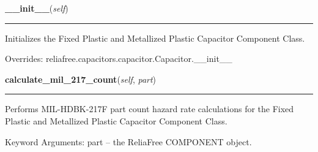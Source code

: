 \hspace{.8\funcindent}\begin{boxedminipage}{\funcwidth}

    \raggedright \textbf{\_\_init\_\_}(\textit{self})

    \vspace{-1.5ex}

    \rule{\textwidth}{0.5\fboxrule}
\setlength{\parskip}{2ex}
    Initializes the Fixed Plastic and Metallized Plastic Capacitor 
    Component Class.

\setlength{\parskip}{1ex}
      Overrides: reliafree.capacitors.capacitor.Capacitor.\_\_init\_\_

    \end{boxedminipage}

    \label{reliafree:capacitors:fixed:Plastic:calculate_mil_217_count}

    \vspace{0.5ex}

\hspace{.8\funcindent}\begin{boxedminipage}{\funcwidth}

    \raggedright \textbf{calculate\_mil\_217\_count}(\textit{self}, \textit{part})

    \vspace{-1.5ex}

    \rule{\textwidth}{0.5\fboxrule}
\setlength{\parskip}{2ex}
    Performs MIL-HDBK-217F part count hazard rate calculations for the 
    Fixed Plastic and Metallized Plastic Capacitor Component Class.

    Keyword Arguments: part -- the ReliaFree COMPONENT object.

\setlength{\parskip}{1ex}
    \end{boxedminipage}

    \label{reliafree:capacitors:fixed:Plastic:calculate_mil_217_stress}

    \vspace{0.5ex}

